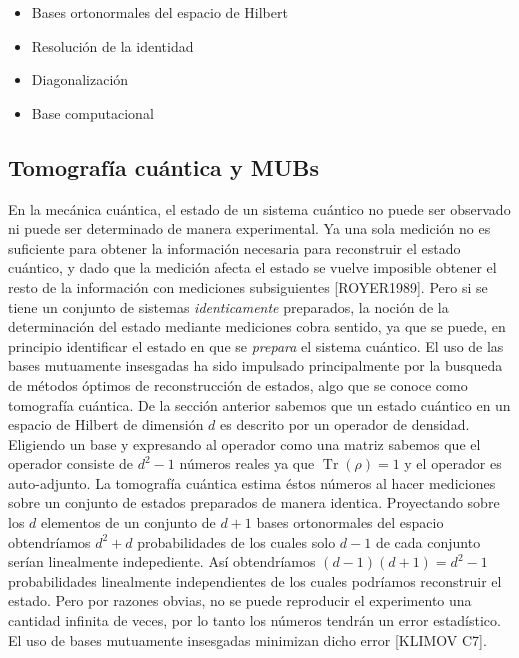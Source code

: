 \documentclass[a4paper]{report}
\DeclareMathOperator{\Tr}{Tr}
\begin{document}
  \begin{itemize}
    \item Bases ortonormales del espacio de Hilbert
    \item Resolución de la identidad
    \item Diagonalización
    \item Base computacional
  \end{itemize}

  \subsection{Tomografía cuántica y MUBs}

  En la mecánica cuántica, el estado de un sistema cuántico
  no puede ser observado ni puede ser determinado de manera
  experimental. Ya una sola medición no es suficiente para
  obtener la información necesaria para reconstruir el
  estado cuántico, y dado que la medición afecta el estado
  se vuelve imposible obtener el resto de la información con
  mediciones subsiguientes [ROYER1989]. Pero si se tiene un conjunto de sistemas
  \textit{identicamente} preparados, la noción de la
  determinación del estado mediante mediciones cobra
  sentido, ya que se puede, en principio identificar el
  estado en que se \textit{prepara} el sistema cuántico.  El uso de las bases mutuamente insesgadas ha
  sido impulsado principalmente por la busqueda de métodos
  óptimos de reconstrucción de estados, algo que se conoce
  como tomografía cuántica. De la sección anterior sabemos
  que un estado cuántico en un espacio de Hilbert de
  dimensión $d$ es descrito por un operador de densidad.
  Eligiendo un base y expresando al operador como una matriz
  sabemos que el operador consiste de $d^2-1$ números reales
  ya que $\Tr(\rho) = 1$ y el operador es auto-adjunto. La
  tomografía cuántica estima éstos números al hacer
  mediciones sobre un conjunto de estados preparados de
  manera identica. Proyectando sobre los $d$ elementos de un
  conjunto de $d+1$ bases ortonormales del espacio
  obtendríamos $d^2+d$ probabilidades de los cuales solo
  $d-1$ de cada conjunto serían linealmente indepediente.
  Así obtendríamos $(d-1)(d+1) = d^2-1$ probabilidades
  linealmente independientes de los cuales podríamos
  reconstruir el estado. Pero por razones obvias, no se
  puede reproducir el experimento una cantidad infinita de
  veces, por lo tanto los números tendrán un error
  estadístico. El uso de bases mutuamente insesgadas
  minimizan dicho error [KLIMOV C7].
\end{document}
